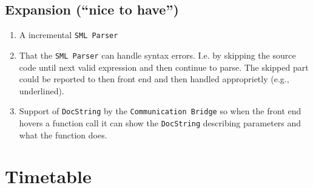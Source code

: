 \documentclass[a4paper,oneside]{memoir}
\begin{document}
\section{Expansion (``nice to have'')}


\begin{enumerate}
\item A incremental \texttt{SML Parser}

\item That the \texttt{SML Parser} can handle syntax errors. I.e. by skipping
  the source code until next valid expression and then continue to parse. The
  skipped part could be reported to then front end and then handled approprietly
  (e.g., underlined).

\item Support of \texttt{DocString} by the \texttt{Communication Bridge} so when
  the front end hovers a function call it can show the \texttt{DocString}
  describing parameters and what the function does.
\end{enumerate}


\appendix

\chapter{Timetable}






\end{document}
